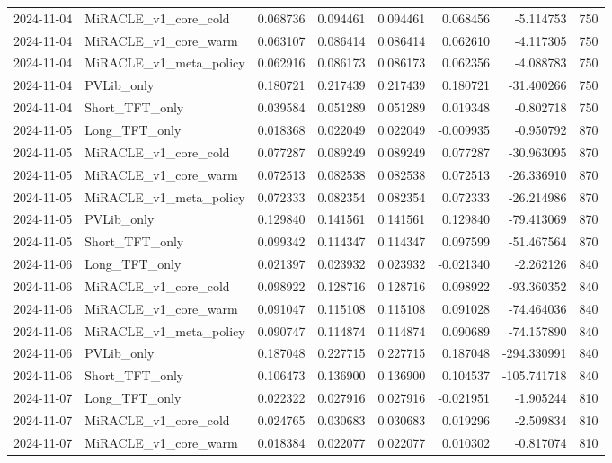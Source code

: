 \begin{tabular}{llrrrrrr}
2024-11-04 & MiRACLE_v1_core_cold & 0.068736 & 0.094461 & 0.094461 & 0.068456 & -5.114753 & 750 \\
2024-11-04 & MiRACLE_v1_core_warm & 0.063107 & 0.086414 & 0.086414 & 0.062610 & -4.117305 & 750 \\
2024-11-04 & MiRACLE_v1_meta_policy & 0.062916 & 0.086173 & 0.086173 & 0.062356 & -4.088783 & 750 \\
2024-11-04 & PVLib_only & 0.180721 & 0.217439 & 0.217439 & 0.180721 & -31.400266 & 750 \\
2024-11-04 & Short_TFT_only & 0.039584 & 0.051289 & 0.051289 & 0.019348 & -0.802718 & 750 \\
2024-11-05 & Long_TFT_only & 0.018368 & 0.022049 & 0.022049 & -0.009935 & -0.950792 & 870 \\
2024-11-05 & MiRACLE_v1_core_cold & 0.077287 & 0.089249 & 0.089249 & 0.077287 & -30.963095 & 870 \\
2024-11-05 & MiRACLE_v1_core_warm & 0.072513 & 0.082538 & 0.082538 & 0.072513 & -26.336910 & 870 \\
2024-11-05 & MiRACLE_v1_meta_policy & 0.072333 & 0.082354 & 0.082354 & 0.072333 & -26.214986 & 870 \\
2024-11-05 & PVLib_only & 0.129840 & 0.141561 & 0.141561 & 0.129840 & -79.413069 & 870 \\
2024-11-05 & Short_TFT_only & 0.099342 & 0.114347 & 0.114347 & 0.097599 & -51.467564 & 870 \\
2024-11-06 & Long_TFT_only & 0.021397 & 0.023932 & 0.023932 & -0.021340 & -2.262126 & 840 \\
2024-11-06 & MiRACLE_v1_core_cold & 0.098922 & 0.128716 & 0.128716 & 0.098922 & -93.360352 & 840 \\
2024-11-06 & MiRACLE_v1_core_warm & 0.091047 & 0.115108 & 0.115108 & 0.091028 & -74.464036 & 840 \\
2024-11-06 & MiRACLE_v1_meta_policy & 0.090747 & 0.114874 & 0.114874 & 0.090689 & -74.157890 & 840 \\
2024-11-06 & PVLib_only & 0.187048 & 0.227715 & 0.227715 & 0.187048 & -294.330991 & 840 \\
2024-11-06 & Short_TFT_only & 0.106473 & 0.136900 & 0.136900 & 0.104537 & -105.741718 & 840 \\
2024-11-07 & Long_TFT_only & 0.022322 & 0.027916 & 0.027916 & -0.021951 & -1.905244 & 810 \\
2024-11-07 & MiRACLE_v1_core_cold & 0.024765 & 0.030683 & 0.030683 & 0.019296 & -2.509834 & 810 \\
2024-11-07 & MiRACLE_v1_core_warm & 0.018384 & 0.022077 & 0.022077 & 0.010302 & -0.817074 & 810 \\

\end{tabular}

